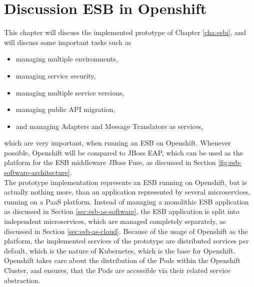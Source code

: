 \chapter{Discussion ESB in Openshift}
\label{cha:esbd}
This chapter will discuss the implemented prototype of Chapter \vref{cha:esbi}, and will discuss some important tasks such as 
\begin{itemize}
	\item managing multiple environments,
	\item managing service security,
	\item managing multiple service versions,
	\item managing public API migration,
	\item and managing Adapters and Message Translators as services,
\end{itemize}
which are very important, when running an ESB on Openshift. Whenever possible, Openshift will be compared to JBoss EAP, which can be used as the platform for the ESB middleware JBoss Fuse, as discussed in Section \vref{fig:esb-software-architecture}. \\

The prototype implementation represents an ESB running on Openshift, but is actually nothing more, than an application represented by several microservices, running on a PaaS platform. Instead of managing a monolithic ESB application as discussed in Section \vref{sec:esb-as-software}, the ESB application is split into independent microservices, which are managed completely separately, as discussed in Section \vref{sec:esb-as-cloud}. Because of the usage of Openshift as the platform, the implemented services of the prototype are distributed services per default, which is the nature of Kubernetes, which is the base for Openshift. Openshift takes care about the distribution of the Pods within the Openshift Cluster, and ensures, that the Pods are accessible via their related service abstraction. \\

